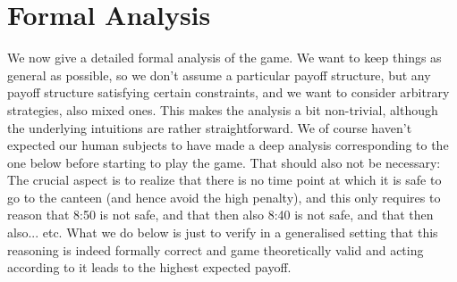\documentclass[twocolumn,a4paper,superscriptaddress,nofootinbib]{revtex4}
\begin{document}
\section{Formal Analysis} \label{appendix:formal}
We now give a detailed formal analysis of the game. We want to keep things as general as possible, so we don't assume a particular payoff structure, but any payoff structure satisfying certain constraints, and we want to consider arbitrary strategies, also mixed ones. This makes the analysis a bit non-trivial, although the underlying intuitions are rather straightforward. We of course haven't expected our human subjects to have made a deep analysis corresponding to the one below before starting to play the game. That should also not be necessary: The crucial aspect is to realize that there is no time point at which it is safe to go to the canteen (and hence avoid the high penalty), and this only requires to reason that 8{:}50 is not safe, and that then also 8{:}40 is not safe, and that then also... etc. What we do below is just to verify in a generalised setting that this reasoning is indeed formally correct and game theoretically valid and acting according to it leads to the highest expected payoff.  
\end{document}
